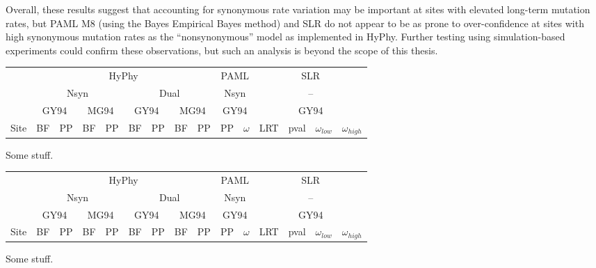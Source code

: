 Overall, these results suggest that accounting for synonymous rate
variation may be important at sites with elevated long-term mutation
rates, but PAML M8 (using the Bayes Empirical Bayes method) and SLR do
not appear to be as prone to over-confidence at sites with high
synonymous mutation rates as the ``nonsynonymous'' model as
implemented in HyPhy. Further testing using simulation-based
experiments could confirm these observations, but such an analysis is
beyond the scope of this thesis.

\bbtable
\centering \footnotesize
\begin{tabular}{rrrrrrrrrrrrrrr}
\toprule
 & \multicolumn{8}{c}{HyPhy} & \multicolumn{2}{c}{PAML} & \multicolumn{4}{c}{SLR} \\
 \cmidrule(r){2-9} \cmidrule(r){10-11} \cmidrule(r){12-15}
 & \multicolumn{4}{c}{Nsyn} & \multicolumn{4}{c}{Dual} & \multicolumn{2}{c}{Nsyn} & \multicolumn{4}{c}{--} \\
 \cmidrule(r){2-5} \cmidrule(r){6-9} \cmidrule(r){10-11} \cmidrule(r){12-15}
 & \multicolumn{2}{c}{GY94} & \multicolumn{2}{c}{MG94} & \multicolumn{2}{c}{GY94} & \multicolumn{2}{c}{MG94} 
 & \multicolumn{2}{c}{GY94} & \multicolumn{4}{c}{GY94} \\
\cmidrule(r){1-15}
Site & BF & PP & BF & PP & 
BF & PP & BF & PP & PP & $\omega$ & LRT & pval & $\omega_{low}$ & $\omega_{high}$ \\
  \midrule

\bottomrule
\end{tabular}
\caption{Some stuff.}
\label{table_syn_rates_hbb_paml}

\begin{tabular}{rrrrrrrrrrrrrrr}
\toprule
 & \multicolumn{8}{c}{HyPhy} & \multicolumn{2}{c}{PAML} & \multicolumn{4}{c}{SLR} \\
 \cmidrule(r){2-9} \cmidrule(r){10-11} \cmidrule(r){12-15}
 & \multicolumn{4}{c}{Nsyn} & \multicolumn{4}{c}{Dual} & \multicolumn{2}{c}{Nsyn} & \multicolumn{4}{c}{--} \\
 \cmidrule(r){2-5} \cmidrule(r){6-9} \cmidrule(r){10-11} \cmidrule(r){12-15}
 & \multicolumn{2}{c}{GY94} & \multicolumn{2}{c}{MG94} & \multicolumn{2}{c}{GY94} & \multicolumn{2}{c}{MG94} 
 & \multicolumn{2}{c}{GY94} & \multicolumn{4}{c}{GY94} \\
\cmidrule(r){1-15}
Site & BF & PP & BF & PP & 
BF & PP & BF & PP & PP & $\omega$ & LRT & pval & $\omega_{low}$ & $\omega_{high}$ \\
  \midrule

\bottomrule
\end{tabular}
\caption{Some stuff.}
\label{table_syn_rates_hbb_ensembl}
\eetable


